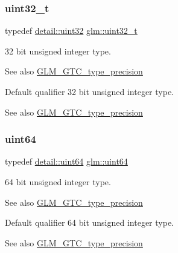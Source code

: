 \subsubsection{\texorpdfstring{uint32\+\_\+t}{uint32\_t}}
{\footnotesize\ttfamily typedef \hyperlink{namespaceglm_1_1detail_ade6cfbf377022aaa391af8cd50489222}{detail\+::uint32} \hyperlink{group__gtc__type__precision_ga822ca53a9ad412504532838906276a99}{glm\+::uint32\+\_\+t}}

32 bit unsigned integer type. \begin{DoxySeeAlso}{See also}
\hyperlink{group__gtc__type__precision}{G\+L\+M\+\_\+\+G\+T\+C\+\_\+type\+\_\+precision}
\end{DoxySeeAlso}
Default qualifier 32 bit unsigned integer type. \begin{DoxySeeAlso}{See also}
\hyperlink{group__gtc__type__precision}{G\+L\+M\+\_\+\+G\+T\+C\+\_\+type\+\_\+precision} 
\end{DoxySeeAlso}
\mbox{\label{group__gtc__type__precision_gae3632bf9b37da66233d78930dd06378a}} 
\subsubsection{\texorpdfstring{uint64}{uint64}}
{\footnotesize\ttfamily typedef \hyperlink{namespaceglm_1_1detail_adec4b19bf4982125e122db2fe03c5810}{detail\+::uint64} \hyperlink{group__gtc__type__precision_gae3632bf9b37da66233d78930dd06378a}{glm\+::uint64}}

64 bit unsigned integer type. \begin{DoxySeeAlso}{See also}
\hyperlink{group__gtc__type__precision}{G\+L\+M\+\_\+\+G\+T\+C\+\_\+type\+\_\+precision}
\end{DoxySeeAlso}
Default qualifier 64 bit unsigned integer type. \begin{DoxySeeAlso}{See also}
\hyperlink{group__gtc__type__precision}{G\+L\+M\+\_\+\+G\+T\+C\+\_\+type\+\_\+precision} 
\end{DoxySeeAlso}
\mbox{\label{group__gtc__type__precision_ga058f57c19e1befdcf12498944bd73e69}} 
